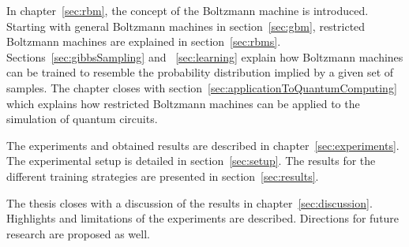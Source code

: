 In chapter~\ref{sec:rbm}, the concept of the Boltzmann machine is introduced. 
Starting with general Boltzmann machines in section~\ref{sec:gbm}, restricted 
Boltzmann machines are explained in section~\ref{sec:rbms}.
Sections~\ref{sec:gibbsSampling} and ~\ref{sec:learning} explain how 
Boltzmann machines can be trained to resemble the probability distribution implied by a given set of samples.
The chapter closes with section~\ref{sec:applicationToQuantumComputing} which explains
how restricted Boltzmann machines can be applied to the simulation of quantum circuits.

The experiments and obtained results are described in chapter~\ref{sec:experiments}. 
The experimental setup is detailed in section~\ref{sec:setup}. The results 
for the different training strategies are presented in section~\ref{sec:results}.

The thesis closes with a discussion of the results in chapter~\ref{sec:discussion}.
Highlights and limitations of the experiments are described. 
Directions for future research are proposed as well.


